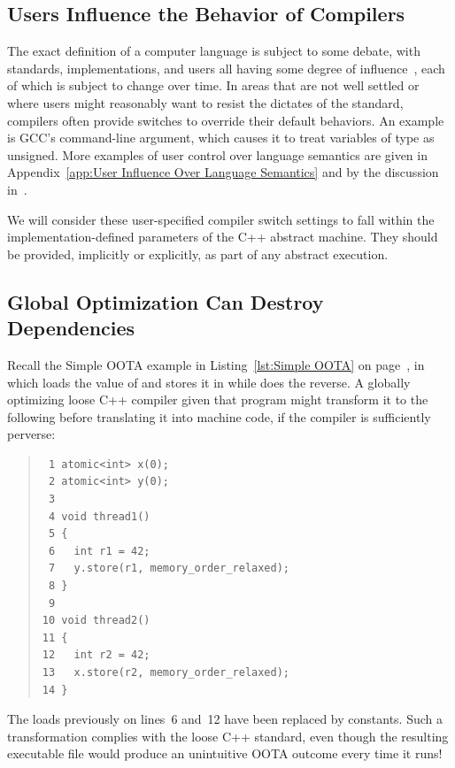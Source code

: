 \documentclass[10]{article}
\begin{document}
\subsection{Users Influence the Behavior of Compilers}
\label{sec:Users Influence the Behavior of Compilers}

The exact definition of a computer language is subject to some debate,
with standards, implementations, and users all having some degree of
influence~\cite{KayvanMemarian2016DepthOfC-1,KayvanMemarian2016DepthOfC-2},
each of which is subject to change over time.
In areas that are not well settled or where users might reasonably
want to resist the dictates of the standard,
compilers often provide switches to override their default behaviors.
An example is GCC's  command-line argument,
which causes it to treat variables of type  as unsigned.
More examples of user control over language semantics are given in
Appendix~\ref{app:User Influence Over Language Semantics}
and by the discussion
in~\cite{KayvanMemarian2016DepthOfC-1,KayvanMemarian2016DepthOfC-2}.

We will consider these user-specified compiler switch settings to fall
within the implementation-defined parameters of the C++ abstract machine.
They should be provided, implicitly or explicitly, as part of any
abstract execution.

\subsection{Global Optimization Can Destroy Dependencies}
\label{sec:Global Optimization Can Destroy Dependencies}

Recall the Simple OOTA example in Listing~\ref{lst:Simple OOTA} on
page~\pageref{lst:Simple OOTA},
in which  loads the value of  and stores it in
 while  does the reverse.
A globally optimizing loose C++ compiler given that program might
transform it to the following before translating it into machine code,
if the compiler is sufficiently perverse:
\begin{quote}
\begin{verbatim}
 1 atomic<int> x(0);
 2 atomic<int> y(0);
 3
 4 void thread1()
 5 {
 6   int r1 = 42;
 7   y.store(r1, memory_order_relaxed);
 8 }
 9
10 void thread2()
11 {
12   int r2 = 42;
13   x.store(r2, memory_order_relaxed);
14 }
\end{verbatim}
\end{quote}
The loads previously on lines~6 and~12 have been replaced by constants.
Such a transformation complies with the loose C++ standard,
even though the resulting executable file would produce an unintuitive
OOTA outcome every time it runs!
\end{document}
